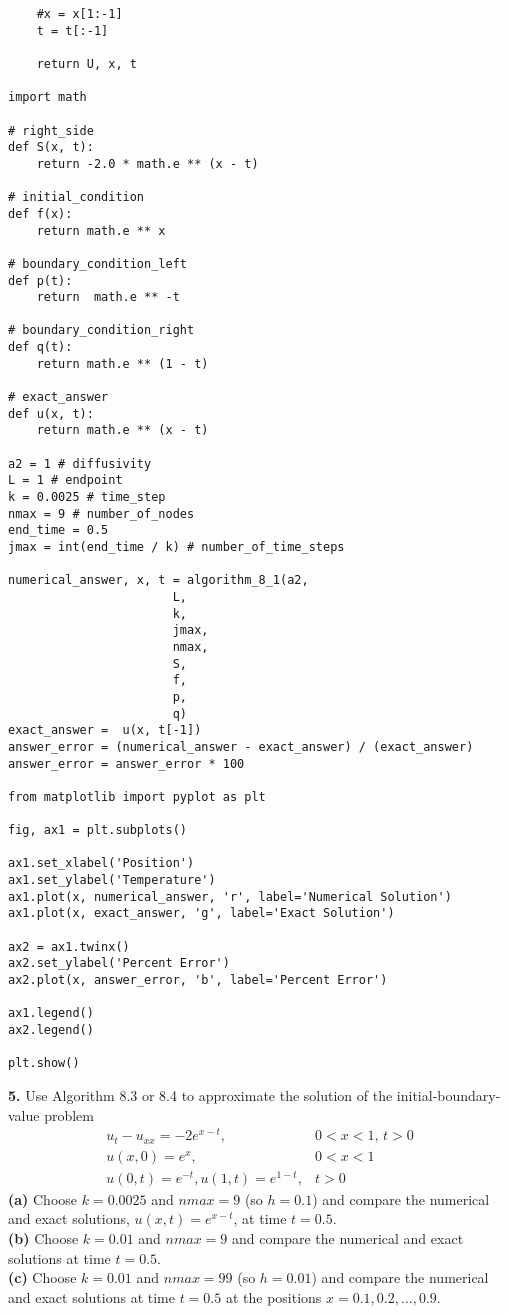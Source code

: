 \documentclass{amsbook}%
\theoremstyle{plain}
\numberwithin{equation}{section}
\begin{document}
\begin{small}
\begin{verbatim}
    #x = x[1:-1]
    t = t[:-1]
            
    return U, x, t

import math

# right_side
def S(x, t):
    return -2.0 * math.e ** (x - t)

# initial_condition
def f(x):
    return math.e ** x

# boundary_condition_left
def p(t):
    return  math.e ** -t

# boundary_condition_right
def q(t):
    return math.e ** (1 - t)

# exact_answer	
def u(x, t):
	return math.e ** (x - t)

a2 = 1 # diffusivity
L = 1 # endpoint
k = 0.0025 # time_step
nmax = 9 # number_of_nodes
end_time = 0.5
jmax = int(end_time / k) # number_of_time_steps

numerical_answer, x, t = algorithm_8_1(a2,
                       L,
                       k,
                       jmax,
                       nmax,
                       S,
                       f,
                       p,
                       q)
exact_answer = 	u(x, t[-1])
answer_error = (numerical_answer - exact_answer) / (exact_answer)
answer_error = answer_error * 100

from matplotlib import pyplot as plt

fig, ax1 = plt.subplots()

ax1.set_xlabel('Position')
ax1.set_ylabel('Temperature')
ax1.plot(x, numerical_answer, 'r', label='Numerical Solution')
ax1.plot(x, exact_answer, 'g', label='Exact Solution')

ax2 = ax1.twinx()
ax2.set_ylabel('Percent Error')
ax2.plot(x, answer_error, 'b', label='Percent Error')

ax1.legend()
ax2.legend()

plt.show()
\end{verbatim}
\end{small}
		
		\noindent\textbf{5.} Use Algorithm 8.3 or 8.4 to approximate the solution of the initial-boundary-value problem 
		\begin{align}
			u_t-u_{xx}=-2e^{x-t}, & 0<x<1,\, t>0\\
			u(x,0)=e^x, & 0<x<1\\
			u(0,t)=e^{-t}, u(1,t)=e^{1-t}, & t>0
		\end{align}
		\textbf{(a)} Choose $k=0.0025$ and $nmax=9$ (so $h=0.1$) and compare the numerical and exact solutions, $u(x,t)=e^{x-t}$, at time $t=0.5$.\\
		\textbf{(b)} Choose $k=0.01$ and $nmax=9$ and compare the numerical and exact solutions at time $t=0.5$.\\
		\textbf{(c)} Choose $k=0.01$ and $nmax=99$ (so $h=0.01$) and compare the numerical and exact solutions at time $t=0.5$ at the positions $x=0.1,0.2,\ldots ,0.9$.
		\\[12pt]
\end{document}
